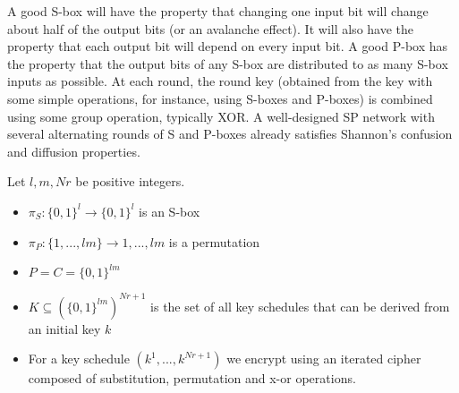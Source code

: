 A good S-box will have the property that changing one input bit will change about half of the output bits (or an avalanche effect).
It will also have the property that each output bit will depend on every input bit.
A good P-box has the property that the output bits of any S-box are distributed to as many S-box inputs as possible.
At each round, the round key (obtained from the key with some simple operations, for instance, using S-boxes and P-boxes)
is combined using some group operation, typically XOR.
A well-designed SP network with several alternating rounds of S and P-boxes already satisfies Shannon's confusion and diffusion properties.

\begin{example}
    Let $l,m,Nr$ be positive integers.
    \begin{itemize}
        \item $\pi_S : \{0,1\}^l \rightarrow \{0,1\}^l$ is an S-box
        \item $\pi_P : \{1,...,lm\} \rightarrow {1,...,lm}$ is a permutation
        \item $P=C=\{0,1\}^{lm}$
        \item $K \subseteq (\{0,1\}^{lm})^{Nr+1}$ is the set of all key schedules that can be derived from an initial key $k$
        \item For a key schedule $(k^1,...,k^{Nr+1})$ we encrypt using an iterated cipher composed of substitution, permutation and x-or operations.
    \end{itemize}
\end{example}

